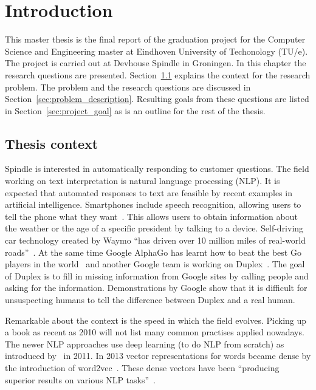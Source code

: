 \chapter{Introduction}
\label{ch:introduction}

\setcounter{page}{0}
This master thesis is the final report of the graduation project for the Computer Science and Engineering master at Eindhoven University of Techonology (TU/e).
The project is carried out at Devhouse Spindle in Groningen.
In this chapter the research questions are presented.
Section~\ref{sec:thesis_context} explains the context for the research problem.
The problem and the research questions are discussed in Section~\ref{sec:problem_description}.
Resulting goals from these questions are listed in Section~\ref{sec:project_goal} as is an outline for the rest of the thesis.

\section{Thesis context}
\label{sec:thesis_context}
Spindle is interested in automatically responding to customer questions.
The field working on text interpretation is natural language processing (NLP).
It is expected that automated responses to text are feasible by recent examples in artificial intelligence.
Smartphones include speech recognition, allowing users to tell the phone what they want~\citep{lopez2017alexa}.
This allows users to obtain information about the weather or the age of a specific president by talking to a device.
Self-driving car technology created by Waymo ``has driven over 10 million miles of real-world roads''~\citep{waymo2018}.
At the same time Google AlphaGo has learnt how to beat the best Go players in the world~\citep{gibney2016google} and another Google team is working on Duplex~\citep{leviathan2018google}.
The goal of Duplex is to fill in missing information from Google sites by calling people and asking for the information.
Demonstrations by Google show that it is difficult for unsuspecting humans to tell the difference between Duplex and a real human.

Remarkable about the context is the speed in which the field evolves.
Picking up a book as recent as 2010 will not list many common practises applied nowadays.
The newer NLP approaches use deep learning (to do NLP from scratch) as introduced by~\citet{collobert2011natural} in 2011.
In 2013 vector representations for words became dense by the introduction of word2vec~\citep{mikolov2013distributed}.
These dense vectors have been ``producing superior results on various NLP tasks''~\citep{young2018recent}.


